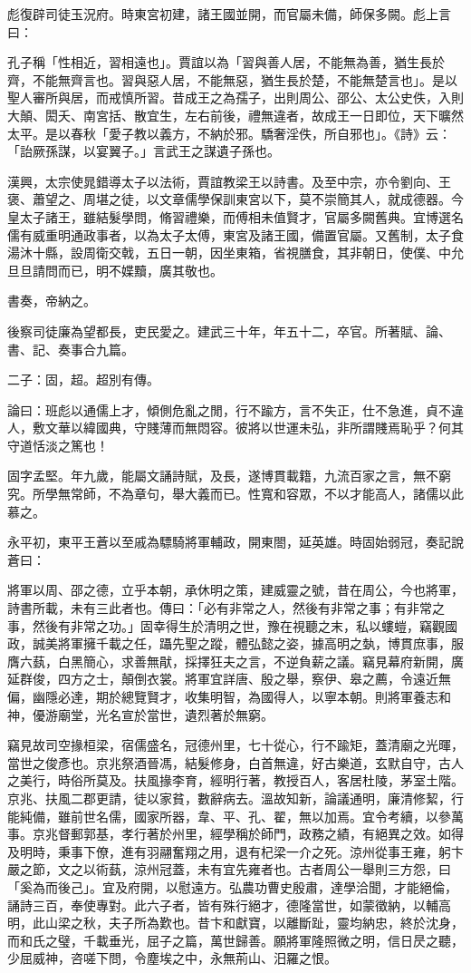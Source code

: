 \begin{pinyinscope}
彪復辟司徒玉況府。時東宮初建，諸王國並開，而官屬未備，師保多闕。彪上言曰：

孔子稱「性相近，習相遠也」。賈誼以為「習與善人居，不能無為善，猶生長於齊，不能無齊言也。習與惡人居，不能無惡，猶生長於楚，不能無楚言也」。是以聖人審所與居，而戒慎所習。昔成王之為孺子，出則周公、邵公、太公史佚，入則大顛、閎夭、南宮括、散宜生，左右前後，禮無違者，故成王一日即位，天下曠然太平。是以春秋「愛子教以義方，不納於邪。驕奢淫佚，所自邪也」。《詩》云：「詒厥孫謀，以宴翼子。」言武王之謀遺子孫也。

漢興，太宗使晁錯導太子以法術，賈誼教梁王以詩書。及至中宗，亦令劉向、王褒、蕭望之、周堪之徒，以文章儒學保訓東宮以下，莫不崇簡其人，就成德器。今皇太子諸王，雖結髮學問，脩習禮樂，而傅相未值賢才，官屬多闕舊典。宜博選名儒有威重明通政事者，以為太子太傅，東宮及諸王國，備置官屬。又舊制，太子食湯沐十縣，設周衛交戟，五日一朝，因坐東箱，省視膳食，其非朝日，使僕、中允旦旦請問而已，明不媟黷，廣其敬也。

書奏，帝納之。

後察司徒廉為望都長，吏民愛之。建武三十年，年五十二，卒官。所著賦、論、書、記、奏事合九篇。

二子：固，超。超別有傳。

論曰：班彪以通儒上才，傾側危亂之閒，行不踰方，言不失正，仕不急進，貞不違人，敷文華以緯國典，守賤薄而無悶容。彼將以世運未弘，非所謂賤焉恥乎？何其守道恬淡之篤也！

固字孟堅。年九歲，能屬文誦詩賦，及長，遂博貫載籍，九流百家之言，無不窮究。所學無常師，不為章句，舉大義而已。性寬和容眾，不以才能高人，諸儒以此慕之。

永平初，東平王蒼以至戚為驃騎將軍輔政，開東閤，延英雄。時固始弱冠，奏記說蒼曰：

將軍以周、邵之德，立乎本朝，承休明之策，建威靈之號，昔在周公，今也將軍，詩書所載，未有三此者也。傳曰：「必有非常之人，然後有非常之事；有非常之事，然後有非常之功。」固幸得生於清明之世，豫在視聽之末，私以螻螘，竊觀國政，誠美將軍擁千載之任，躡先聖之蹤，體弘懿之姿，據高明之埶，博貫庶事，服膺六蓺，白黑簡心，求善無猒，採擇狂夫之言，不逆負薪之議。竊見幕府新開，廣延群俊，四方之士，顛倒衣裳。將軍宜詳唐、殷之舉，察伊、皋之薦，令遠近無偏，幽隱必達，期於總覽賢才，收集明智，為國得人，以寧本朝。則將軍養志和神，優游廟堂，光名宣於當世，遺烈著於無窮。

竊見故司空掾桓梁，宿儒盛名，冠德州里，七十從心，行不踰矩，蓋清廟之光暉，當世之俊彥也。京兆祭酒晉馮，結髮修身，白首無違，好古樂道，玄默自守，古人之美行，時俗所莫及。扶風掾李育，經明行著，教授百人，客居杜陵，茅室土階。京兆、扶風二郡更請，徒以家貧，數辭病去。溫故知新，論議通明，廉清修絜，行能純備，雖前世名儒，國家所器，韋、平、孔、翟，無以加焉。宜令考續，以參萬事。京兆督郵郭基，孝行著於州里，經學稱於師門，政務之績，有絕異之效。如得及明時，秉事下僚，進有羽翮奮翔之用，退有杞梁一介之死。涼州從事王雍，躬卞嚴之節，文之以術蓺，涼州冠蓋，未有宜先雍者也。古者周公一舉則三方怨，曰「奚為而後己」。宜及府開，以慰遠方。弘農功曹史殷肅，達學洽聞，才能絕倫，誦詩三百，奉使專對。此六子者，皆有殊行絕才，德隆當世，如蒙徵納，以輔高明，此山梁之秋，夫子所為歎也。昔卞和獻寶，以離斷趾，靈均納忠，終於沈身，而和氏之璧，千載垂光，屈子之篇，萬世歸善。願將軍隆照微之明，信日昃之聽，少屈威神，咨嗟下問，令塵埃之中，永無荊山、汨羅之恨。


\end{pinyinscope}
